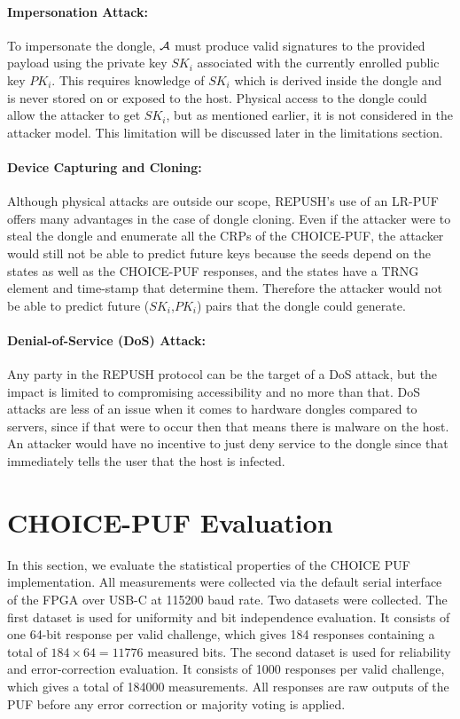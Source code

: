 \paragraph{Impersonation Attack:} To impersonate the dongle, $\mathcal{A}$ must produce valid signatures to the provided payload using the private key $SK_i$ associated with the currently enrolled public key $PK_i$. This requires knowledge of $SK_i$ which is derived inside the dongle and is never stored on or exposed to the host. Physical access to the dongle could allow the attacker to get $SK_i$, but as mentioned earlier, it is not considered in the attacker model. This limitation will be discussed later in the limitations section. 

\paragraph{Device Capturing and Cloning:}
Although physical attacks are outside our scope, REPUSH's use of an LR-PUF offers many advantages in the case of dongle cloning. Even if the attacker were to steal the dongle and enumerate all the CRPs of the CHOICE-PUF, the attacker would still not be able to predict future keys because the seeds depend on the states as well as the CHOICE-PUF responses, and the states have a TRNG element and time-stamp that determine them. Therefore the attacker would not be able to predict future ($SK_i$,$PK_i$) pairs that the dongle could generate.

\paragraph{Denial-of-Service (DoS) Attack:}
Any party in the REPUSH protocol can be the target of a DoS attack, but the impact is limited to compromising accessibility and no more than that. DoS attacks are less of an issue when it comes to hardware dongles compared to servers, since if that were to occur then that means there is malware on the host. An attacker would have no incentive to just deny service to the dongle since that immediately tells the user that the host is infected.

\section{CHOICE-PUF Evaluation}

In this section, we evaluate the statistical properties of the CHOICE PUF implementation. All measurements were collected via the default serial interface of the FPGA over USB-C at 115200 baud rate. Two datasets were collected. The first dataset is used for uniformity and bit independence evaluation. It consists of one 64-bit response per valid challenge, which gives 184 responses containing a total of $184\times64=11776$ measured bits. The second dataset is used for reliability and error-correction evaluation. It consists of 1000 responses per valid challenge, which gives a total of 184000 measurements. All responses are raw outputs of the PUF before any error correction or majority voting is applied.

